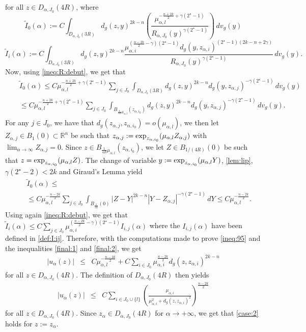 \documentclass[reqno]{amsart}
\def \rn {\mathbb{R}^n}
\def \crit {2^\star}
\def \ua {u_\alpha}
\def \za {z_\alpha}
\def \mai {\mu_{\alpha,i}}
\def \zai {z_{\alpha,i}}
\def \zaj {z_{\alpha,j}}
\def \mal {\mu_{\alpha,l}}
\begin{document}
for all $z\in D_{\alpha, J_0}(4R)$, where
$$\tilde{I}_0(\alpha):=C\int_{D_{\alpha, J_0}(3R)}d_g(z,y)^{2k-n}\left(\frac{\mal^{ -\frac{n+2k}{2} +\gamma(\crit-1)}  }{R_{\alpha, J_0}(y)^{\gamma(\crit-1)}}\right)\, dv_g(y)$$
$$\tilde{I}_i(\alpha):=C\int_{D_{\alpha, J_0}(3R)}d_g(z,y)^{2k-n} \frac{\mai^{(\frac{n-2k}{2}-\gamma )(\crit-1)}d_g(y,\zai)^{(\crit-1)(2k-n+2\gamma)}}{R_{\alpha, J_0}(y)^{\gamma(\crit-1)}} \, dv_g(y).$$
Now, using \eqref{ineq:R:debut}, we get that
\begin{eqnarray*}
&&\tilde{I}_0(\alpha)\leq C\mal^{ -\frac{n+2k}{2} +\gamma(\crit-1)}  \sum_{j\in J_0}\int_{D_{\alpha, J_0}(3R) }d_g(z,y)^{2k-n}d_g(y,\zaj)^{-\gamma(\crit-1)}\, dv_g(y)\\
&&\leq C\mal^{ -\frac{n+2k}{2} +\gamma(\crit-1)}  \sum_{j\in J_0}\int_{B_{\frac{1}{3R}\mal}(z_{\alpha, i_0}) }d_g(z,y)^{2k-n}d_g(y,\zaj)^{-\gamma(\crit-1)}\, dv_g(y).
\end{eqnarray*}
For any $j\in J_0$, we have that $d_g(\zaj, z_{\alpha, i_0})=o(\mal)$, we then let $Z_{\alpha, j}\in B_1(0)\subset \rn$ be such that $\zaj:=\hbox{exp}_{z_{\alpha, i_0}}(\mal Z_{\alpha, j})$ with $\lim_{\alpha\to \infty}Z_{\alpha, j}=0$. Since $z\in B_{\frac{1}{4R}\mal}(z_{\alpha, i_0})$, we let $Z\in B_{1/(4R)}(0)$ be such that $z=\hbox{exp}_{z_{\alpha, i_0}}(\mal Z )$. The change of variable $y:=\hbox{exp}_{z_{\alpha, i_0}}(\mal Y)$, \eqref{lem:lip}, $\gamma(\crit-2)<2k$ and  Giraud's Lemma yield
\begin{eqnarray}
&&\tilde{I}_0(\alpha)\leq  \nonumber\\
&&\leq C\mal^{ -\frac{n-2k}{2} }  \sum_{j\in J_0}\int_{B_{\frac{1}{3R}}(0) } |Z-Y|^{2k-n}| Y- Z_{\alpha, j}|^{-\gamma(\crit-1)} \, dY\leq C\mal^{ -\frac{n-2k}{2} }. \label{final:2}
\end{eqnarray}
Using again \eqref{ineq:R:debut}, we get that $\tilde{I}_i(\alpha)\leq C\sum_{j\in J_0}\mai^{ (\frac{n-2k}{2}-\gamma )(\crit-1)}I_{i,j}(\alpha)$ where the $I_{i,j}(\alpha)$ have been defined in \eqref{def:I:ij}. Therefore, with the computations made to prove \eqref{ineq:95} and the inequalities \eqref{final:1} and \eqref{final:2},  we get
\begin{eqnarray*}
|\ua(z)|&\leq& C\mal^{ -\frac{n-2k}{2}  }+C\sum_{i\in J_0} \mai^{\frac{n-2k}{2}}d_g(z,\zai)^{2k-n}  \end{eqnarray*}
for all $z\in D_{\alpha, J_0}(4R)$. The definition of $D_{\alpha, J_0}(4R)$ then yields
\begin{eqnarray}
|\ua(z)|&\leq&  C\sum_{i\in J_0\cup\{l\}} \left(\frac{\mai}{\mai^2+d_g(z,\zai)^2}\right)^{\frac{n-2k}{2}}   \label{case:2}
\end{eqnarray}
for all  $z\in D_{\alpha, J_0}(4R)$. Since $\za\in D_{\alpha, J_0}(4R)$ for $\alpha\to +\infty$, we get that \eqref{case:2} holds for $z:=z_\alpha$. 
\end{document}
